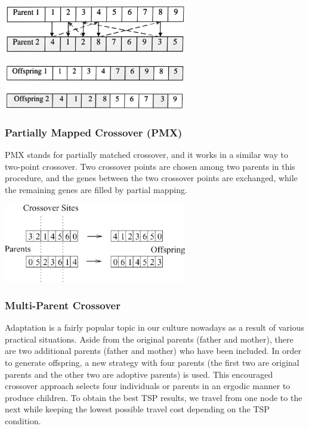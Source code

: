 \documentclass{article}
\begin{document}
\begin{center}
    \includegraphics[width=8cm]{crossover01.png}
\end{center}
\begin{center}
     \includegraphics[width=8cm]{crossover02.png}
\end{center}
\subsubsection{Partially Mapped Crossover (PMX)}
PMX stands for partially matched crossover, and it works in a similar way to two-point crossover. Two crossover
points are chosen among two parents in this procedure, and the genes between the two crossover points are
exchanged, while the remaining genes are filled by partial mapping.
\begin{center}
    \includegraphics[width=8cm]{latexImage_ec81ff7afb5fadf70729ac7d59b20bbc.png}
\end{center}
\subsubsection{Multi-Parent Crossover}
Adaptation is a fairly popular topic in our culture nowadays as a result of various practical situations. Aside from the
original parents (father and mother), there are two additional parents (father and mother) who have been included. In
order to generate offspring, a new strategy with four parents (the first two are original parents and the other two are
adoptive parents) is used. This encouraged crossover approach selects four individuals or parents in an ergodic
manner to produce children. To obtain the best TSP results, we travel from one node to the next while keeping the
lowest possible travel cost depending on the TSP condition.
\end{document}
